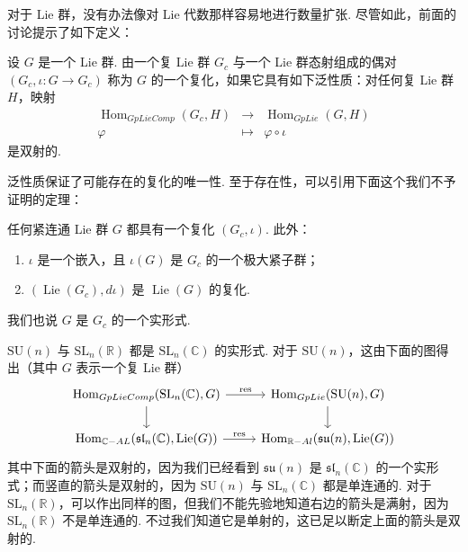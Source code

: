 \begin{numpara}\label{np:lie-1-11-3}
对于 Lie 群，没有办法像对 Lie 代数那样容易地进行数量扩张. 尽管如此，前面的讨论提示了如下定义：
\begin{definition*}
设 $G$ 是一个 Lie 群. 由一个复 Lie 群 $G_c$ 与一个 Lie 群态射组成的偶对 $(G_c,\iota:G\longrightarrow G_c)$ 称为 $G$ 的一个复化，如果它具有如下泛性质：对任何复 Lie 群 $H$，映射
\[
\begin{array}{rcl}
\operatorname{Hom}_{GpLieComp}(G_c,H) & \longrightarrow & \operatorname{Hom}_{GpLie}(G,H)\\
\varphi & \longmapsto & \varphi\circ\iota
\end{array}
\]
是双射的.
\end{definition*}
泛性质保证了可能存在的复化的唯一性. 至于存在性，可以引用下面这个我们不予证明的定理：
\begin{theorem*}
任何紧连通 Lie 群 $G$ 都具有一个复化 $(G_c,\iota)$. 此外：
\begin{enumerate}[label=\roman*)]
\item $\iota$ 是一个嵌入，且 $\iota(G)$ 是 $G_c$ 的一个极大紧子群；
\item $(\operatorname{Lie}(G_c),d\iota)$ 是 $\operatorname{Lie}(G)$ 的复化.
\end{enumerate}
我们也说 $G$ 是 $G_c$ 的一个实形式.
\end{theorem*}
\begin{example*}
$\mathrm{SU}(n)$ 与 $\mathrm{SL}_n(\mathbb R)$ 都是 $\mathrm{SL}_n(\mathbb C)$ 的实形式. 对于 $\mathrm{SU}(n)$，这由下面的图得出（其中 $G$ 表示一个复 Lie 群）
\[
\begin{tikzcd}
\operatorname{Hom}_{GpLieComp}(\mathrm{SL}_n(\mathbb C),G)
\ar[r,"\mathrm{res}"]
\ar[d]
&
\operatorname{Hom}_{GpLie}(\mathrm{SU}(n),G)
\ar[d]
\\
\operatorname{Hom}_{\mathbb C-AL}(\mathfrak{sl}_n(\mathbb C),\operatorname{Lie}(G))
\ar[r,"\mathrm{res}"]
&
\operatorname{Hom}_{\mathbb R-Al}(\mathfrak{su}(n),\operatorname{Lie}(G))
\end{tikzcd}
\]
其中下面的箭头是双射的，因为我们已经看到 $\mathfrak{su}(n)$ 是 $\mathfrak{sl}_n(\mathbb C)$ 的一个实形式；而竖直的箭头是双射的，因为 $\mathrm{SU}(n)$ 与 $\mathrm{SL}_n(\mathbb C)$ 都是单连通的. 对于 $\mathrm{SL}_n(\mathbb R)$，可以作出同样的图，但我们不能先验地知道右边的箭头是满射，因为 $\mathrm{SL}_n(\mathbb R)$ 不是单连通的. 不过我们知道它是单射的，这已足以断定上面的箭头是双射的.
\end{example*}
\begin{example*}

\end{example*}
\end{numpara}
